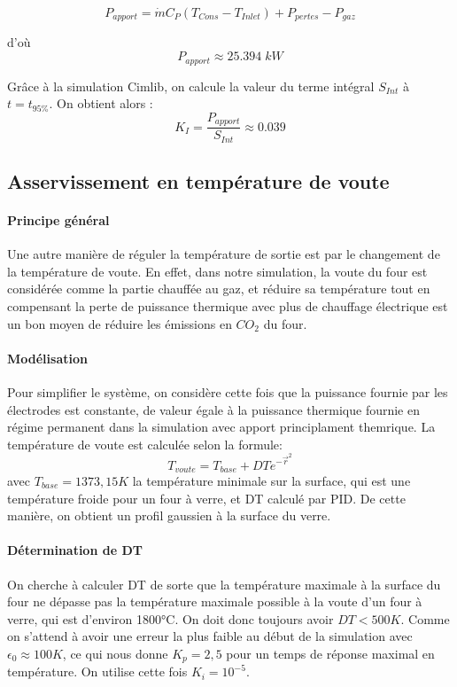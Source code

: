 \documentclass[12pt, a4paper, french, BCOR = 0pt, DIV = 10]{scrartcl}
\begin{document}
    $$P_{apport}=\dot{m}C_P(T_{Cons}-T_{Inlet}) + P_{pertes} - P_{gaz}$$
     
    d'où
    $$P_{apport} \approx 25.394\;kW$$

    Grâce à la simulation Cimlib, on calcule la valeur du terme intégral $S_{Int}$ à $t=t_{95\%}$. On obtient alors :
    $$K_I = \frac{P_{apport}}{S_{Int}} \approx 0.039$$

    \subsection{Asservissement en température de voute}
    \paragraph{Principe général}
    Une autre manière de réguler la température de sortie est par le changement de la température de voute. En effet, dans notre simulation, la voute du four est considérée comme la partie chauffée au gaz, et réduire sa température tout en compensant la perte de puissance thermique avec plus de chauffage électrique est un bon moyen de réduire les émissions en $CO_{2}$ du four.

    \paragraph{Modélisation}
    Pour simplifier le système, on considère cette fois que la puissance fournie par les électrodes est constante, de valeur égale à la puissance thermique fournie en régime permanent dans la simulation avec apport principlament themrique. La température de voute est calculée selon la formule:
    $$
        T_{voute} = T_{base} + DT e^{-\vec{r}^{2}}
    $$
    avec $T_{base} = 1373,15K$ la température minimale sur la surface, qui est une température froide pour un four à verre, et DT calculé par PID. De cette manière, on obtient un profil gaussien à la surface du verre.

    \paragraph{Détermination de DT}
    On cherche à calculer DT de sorte que la température maximale à la surface du four ne dépasse pas la température maximale possible à la voute d'un four à verre, qui est d'environ 1800°C. On doit donc toujours avoir $DT < 500K$. Comme on s'attend à avoir une erreur la plus faible au début de la simulation avec $\epsilon_{0} \approx 100K$, ce qui nous donne $K_p = 2,5$ pour un temps de réponse maximal en température. On utilise cette fois $K_{i} = 10^{-5}$.
\end{document}
